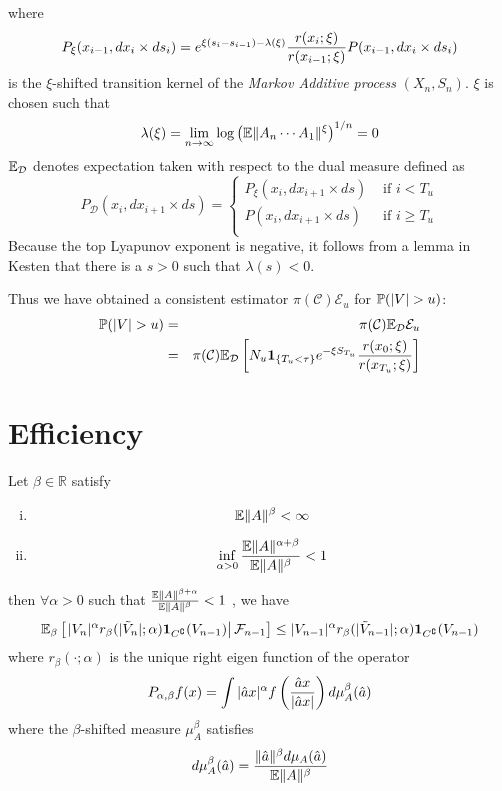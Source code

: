 \documentclass{article}
\begin{document}
where
\[
P_\xi(x_{i-1}, dx_i \times ds_i) = e^{\xi(s_i - s_{i-1}) -
  \lambda(\xi)} {r(x_i; \xi) \over r(x_{i-1}; \xi)} P(x_{i-1}, dx_i
\times ds_i)
\]
is the $\xi$-shifted transition kernel of the {\it Markov Additive
  process} $(X_n, S_n)$. $\xi$ is chosen such that 
\[
\lambda(\xi) = \lim_{n \to \infty} \log \left(
\E \|A_n \cdots A_1\|^\xi
\right)^{1/n} = 0
\]
$\E_{\mathcal D}$ denotes expectation taken with respect to the dual
measure defined as
\[
P_{\mathcal D} (x_i, dx_{i+1} \times ds) = \left\{
  \begin{array}{ll}
    P_\xi (x_i, dx_{i+1} \times ds) & \text{ if } i < T_u \\
    P(x_i, dx_{i+1} \times ds) & \text{ if } i \geq T_u \\
  \end{array}
\right.
\]
Because the top Lyapunov exponent is negative, it follows from a lemma
in Kesten \cite{Kesten1973} that there is a $s > 0$ such that
$\lambda(s) < 0$.

Thus we have obtained a consistent estimator
$\pi(\mathcal C)\mathcal E_u$ for $\P(|V| > u)$:
\begin{eqnarray*}
\P(|V| > u) &=& \pi(\mathcal C) \E_{\mathcal D} \mathcal E_u \\
&=& \pi(\mathcal C) \E_{\mathcal D} \left[
  N_u \1{T_u < \tau} e^{-\xi S_{T_u}} {r(x_0; \xi)
    \over r(x_{T_u}; \xi)}
\right]
\end{eqnarray*}

\section{Efficiency}\label{sec:efficiency}
\begin{lemma}
  Let $\beta \in \mathbb R$ satisfy
  \begin{enumerate}[(i)]
  \item
    \begin{equation}
      \label{eq:drift_cond1}
      \E \|A\|^\beta < \infty      
    \end{equation}
  \item 
    \begin{equation}
      \label{eq:drift_cond2}
    \inf_{\alpha > 0} {\E \|A\|^{\alpha + \beta}
      \over 
      \E \|A\|^{\beta}
    } < 1
    \end{equation}
  \end{enumerate}
  then $\forall \alpha > 0$ such that $\frac{\E\|A\|^{\beta +
      \alpha}}{\E\|A\|^\beta} < 1$ , we have
  \begin{equation}
    \label{eq:drift}
    \E_\beta \left[\left.
        |V_n|^\alpha r_\beta(|\tilde V_n|; \alpha) \I{C^\complement}(V_{n-1}) \right|
      \mathcal F_{n-1} \right] \leq |V_{n-1}|^\alpha r_\beta(|\tilde
    V_{n-1}|; \alpha) \I{C^\complement}(V_{n-1})
  \end{equation}
  where $r_\beta(\cdot; \alpha)$ is the unique right eigen function of the
  operator
  \[
  P_{\alpha, \beta} f(x) = \int |\hat a x|^\alpha f\left(
    {\hat a x \over |\hat a x|}
  \right) d\mu_A^\beta(\hat a)
  \]
  where the $\beta$-shifted measure $\mu_A^\beta$ satisfies
  \[
  d\mu_A^\beta(\hat a) = {\|\hat a\|^\beta d\mu_A(\hat a) \over \E\|A\|^\beta}
  \]
\end{lemma}
\end{document}
